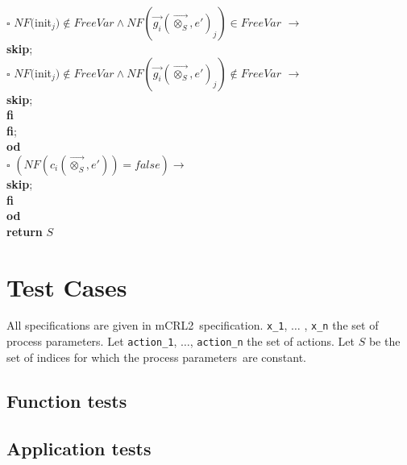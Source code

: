 \index{}\documentclass[a4paper,10pt]{article}
\theoremstyle{plain}
\theoremstyle{definition}
\newcommand{\ovr}{\overrightarrow}
\newcommand{\mcrl}{mCRL2}
\newcommand{\pps}{process parameters}
\newcommand{\tb}{\textbf}
\newcommand{\ra}{$\rightarrow$}
\newcommand{\sq}{$\square$}
\begin{document}
\begin{tabbing}
  \>	\>	\>	\>	\>	  \>	\>	\sq 	\> $NF($init$_j) \not\in FreeVar \wedge NF(\ovr{g_i}(\ovr{\otimes_S}, e')_j) \in FreeVar$ \ra \\
  \>	\>	\>	\>	\>	  \>	\>		\>	\>	\tb{skip};\\ 

  \>	\>	\>	\>	\>	  \>	\>	\sq 	\> $NF($init$_j) \not\in FreeVar \wedge NF(\ovr{g_i}(\ovr{\otimes_S}, e')_j) \not\in FreeVar$ \ra \\
  \>	\>	\>	\>	\>	  \>	\>		\>	\>	\tb{skip};\\ 

 \>	\>	\>	\>	\>	\>	\>	\tb{fi}	\\
  \>	\>	\> 	\> 	\>          \tb{fi}; \\
  \>	\>	\>	\> \tb{od}\\
  \>	\>	\sq 	\>  $(NF(c_i(\ovr{\otimes_S},e')) = false) \rightarrow$ \\
  \>	\>	\> 	\>\tb{skip};\\
  \>	\>	\tb{fi}\\
  \>	\tb{od} \\
 \tb{return} $S$
\end{tabbing} 
\newpage

\section{Test Cases}
All specifications are given in \mcrl\ specification.
\verb"x_1", $\ldots$ , \verb"x_n" the set of process parameters.
Let \verb"action_1", $\ldots$, \verb "action_n" the set of actions.
Let $S$ be the set of indices for which the \pps\ are constant. 

\subsection{Function tests}

\subsection{Application tests}
\end{document}
